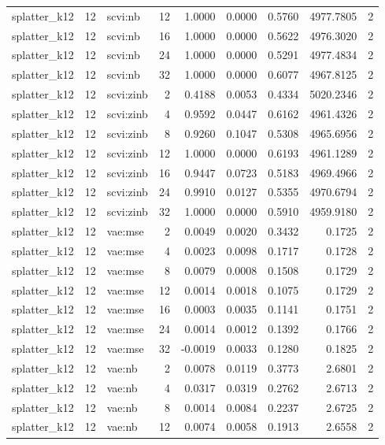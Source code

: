 \begin{tabular}{lrlrrrrrr}
splatter\_k12 & 12 & scvi:nb & 12 & 1.0000 & 0.0000 & 0.5760 & 4977.7805 & 2 \\
splatter\_k12 & 12 & scvi:nb & 16 & 1.0000 & 0.0000 & 0.5622 & 4976.3020 & 2 \\
splatter\_k12 & 12 & scvi:nb & 24 & 1.0000 & 0.0000 & 0.5291 & 4977.4834 & 2 \\
splatter\_k12 & 12 & scvi:nb & 32 & 1.0000 & 0.0000 & 0.6077 & 4967.8125 & 2 \\
splatter\_k12 & 12 & scvi:zinb & 2 & 0.4188 & 0.0053 & 0.4334 & 5020.2346 & 2 \\
splatter\_k12 & 12 & scvi:zinb & 4 & 0.9592 & 0.0447 & 0.6162 & 4961.4326 & 2 \\
splatter\_k12 & 12 & scvi:zinb & 8 & 0.9260 & 0.1047 & 0.5308 & 4965.6956 & 2 \\
splatter\_k12 & 12 & scvi:zinb & 12 & 1.0000 & 0.0000 & 0.6193 & 4961.1289 & 2 \\
splatter\_k12 & 12 & scvi:zinb & 16 & 0.9447 & 0.0723 & 0.5183 & 4969.4966 & 2 \\
splatter\_k12 & 12 & scvi:zinb & 24 & 0.9910 & 0.0127 & 0.5355 & 4970.6794 & 2 \\
splatter\_k12 & 12 & scvi:zinb & 32 & 1.0000 & 0.0000 & 0.5910 & 4959.9180 & 2 \\
splatter\_k12 & 12 & vae:mse & 2 & 0.0049 & 0.0020 & 0.3432 & 0.1725 & 2 \\
splatter\_k12 & 12 & vae:mse & 4 & 0.0023 & 0.0098 & 0.1717 & 0.1728 & 2 \\
splatter\_k12 & 12 & vae:mse & 8 & 0.0079 & 0.0008 & 0.1508 & 0.1729 & 2 \\
splatter\_k12 & 12 & vae:mse & 12 & 0.0014 & 0.0018 & 0.1075 & 0.1729 & 2 \\
splatter\_k12 & 12 & vae:mse & 16 & 0.0003 & 0.0035 & 0.1141 & 0.1751 & 2 \\
splatter\_k12 & 12 & vae:mse & 24 & 0.0014 & 0.0012 & 0.1392 & 0.1766 & 2 \\
splatter\_k12 & 12 & vae:mse & 32 & -0.0019 & 0.0033 & 0.1280 & 0.1825 & 2 \\
splatter\_k12 & 12 & vae:nb & 2 & 0.0078 & 0.0119 & 0.3773 & 2.6801 & 2 \\
splatter\_k12 & 12 & vae:nb & 4 & 0.0317 & 0.0319 & 0.2762 & 2.6713 & 2 \\
splatter\_k12 & 12 & vae:nb & 8 & 0.0014 & 0.0084 & 0.2237 & 2.6725 & 2 \\
splatter\_k12 & 12 & vae:nb & 12 & 0.0074 & 0.0058 & 0.1913 & 2.6558 & 2 \\

\end{tabular}
